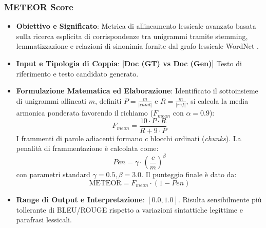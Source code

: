 \subsubsection{METEOR Score}
\label{subsubsec:meteor}
\begin{itemize}[leftmargin=*, label=\textbullet]
    \item \textbf{Obiettivo e Significato}: Metrica di allineamento lessicale avanzato basata sulla ricerca esplicita di corrispondenze tra unigrammi tramite stemming, lemmatizzazione e relazioni di sinonimia fornite dal grafo lessicale WordNet \cite{banerjee_meteor_2005}.
    \item \textbf{Input e Tipologia di Coppia}: \textbf{[Doc (GT) vs Doc (Gen)]} Testo di riferimento e testo candidato generato.
    \item \textbf{Formulazione Matematica ed Elaborazione}: Identificato il sottoinsieme di unigrammi allineati $m$, definiti $P = \frac{m}{|cand|}$ e $R = \frac{m}{|ref|}$, si calcola la media armonica ponderata favorendo il richiamo ($F_{mean}$ con $\alpha=0.9$):
    \begin{equation}
        F_{mean} = \frac{10 \cdot P \cdot R}{R + 9 \cdot P}
    \end{equation}
    I frammenti di parole adiacenti formano $c$ blocchi ordinati (\emph{chunks}). La penalità di frammentazione è calcolata come:
    \begin{equation}
        Pen = \gamma \cdot \left(\frac{c}{m}\right)^\beta
    \end{equation}
    con parametri standard $\gamma=0.5, \beta=3.0$. Il punteggio finale è dato da:
    \begin{equation}
        \text{METEOR} = F_{mean} \cdot (1 - Pen)
        \label{eq:meteor_formula}
    \end{equation}
    \item \textbf{Range di Output e Interpretazione}: $[0.0, 1.0]$. Risulta sensibilmente più tollerante di BLEU/ROUGE rispetto a variazioni sintattiche legittime e parafrasi lessicali.
\end{itemize}

